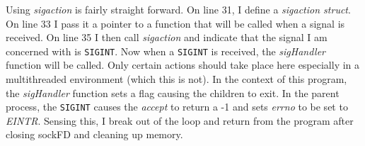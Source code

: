\documentclass[../main.tex]{subfiles}
\begin{document}
	Using \textit{sigaction} is fairly straight forward.  On line 31, I define a \textit{sigaction struct}.  On line 33 I pass it a pointer to a function that will be called when a signal is received. On line 35 I then call \textit{sigaction} and indicate that the signal I am concerned with is \texttt{SIGINT}. Now when a \texttt{SIGINT} is received, the \textit{sigHandler} function will be called.  Only certain actions should take place here especially in a multithreaded environment (which this is not).  In the context of this program, the \textit{sigHandler} function sets a flag causing the children to exit.  In the parent process, the \texttt{SIGINT} causes the \textit{accept} to return a -1 and sets \textit{errno} to be set to \textit{EINTR}.  Sensing this, I break out of the loop and return from the program after closing sockFD and cleaning up memory.
\end{document}
